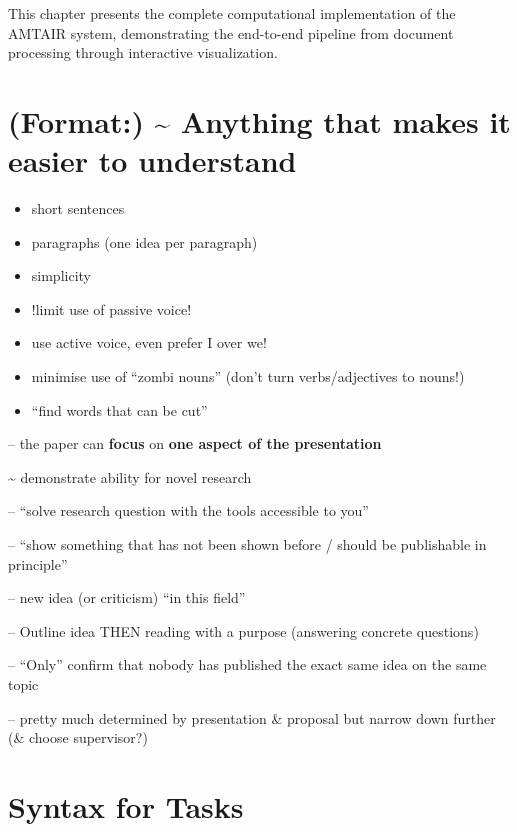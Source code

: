 \documentclass[
  11pt,
  letterpaper,
]{book}
\providecommand{\tightlist}{%
  \setlength{\itemsep}{0pt}\setlength{\parskip}{0pt}}
\begin{document}
This chapter presents the complete computational implementation of the
AMTAIR system, demonstrating the end-to-end pipeline from document
processing through interactive visualization.

\section{(Format:) \textasciitilde{} Anything that makes it easier to
understand}\label{format-anything-that-makes-it-easier-to-understand}

\begin{itemize}
\tightlist
\item
  short sentences\\
\item
  paragraphs (one idea per paragraph)\\
\item
  simplicity\\
\item
  !limit use of passive voice!\\
\item
  use active voice, even prefer I over we!\\
\item
  minimise use of ``zombi nouns'' (don't turn verbs/adjectives to
  nouns!)\\
\item
  ``find words that can be cut''
\end{itemize}

-- the paper can \textbf{focus} on \textbf{one aspect of the
presentation}

\textasciitilde{} demonstrate ability for novel research

-- ``solve research question with the tools accessible to you''

-- ``show something that has not been shown before / should be
publishable in principle''

-- new idea (or criticism) ``in this field''

-- Outline idea THEN reading with a purpose (answering concrete
questions)

-- ``Only'' confirm that nobody has published the exact same idea on the
same topic

-- pretty much determined by presentation \& proposal but narrow down
further (\& choose supervisor?)

\section{Syntax for Tasks}\label{syntax-for-tasks-1}
\end{document}
